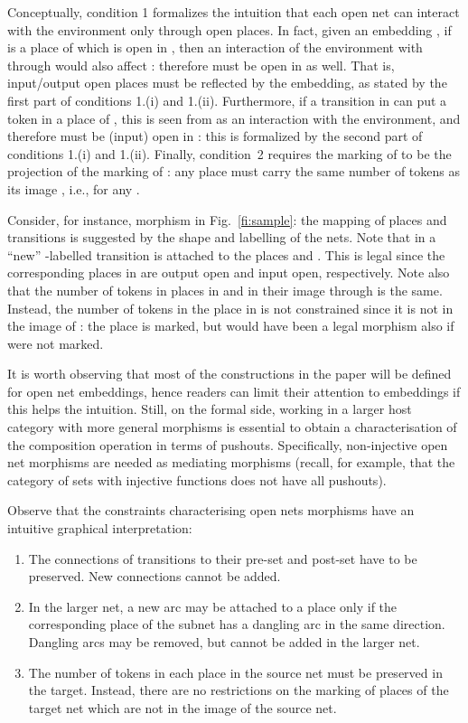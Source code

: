 \documentclass{LMCS}
\begin{document}
Conceptually, condition 1 formalizes the
intuition that each open net can interact with the environment only
through open places.  In fact, given an embedding ,
if  is a place of  which is
open in , then an interaction of the environment with 
through  would also affect : therefore  must be open in
 as well. That is, input/output open places must be reflected by
the embedding, as stated by the first part of conditions 1.(i) and
1.(ii).  Furthermore, if a transition in  can put a
token in a place  of , this is seen from  as an
interaction with the environment, and therefore  must be (input)
open in : this is formalized by the second part of conditions
1.(i) and 1.(ii).  
Finally, condition~2 requires the marking of  to be the
projection of the marking of : any place  must
carry the same number of tokens as its image ,
i.e.,  for any .




Consider, for instance, morphism  in
Fig.~\ref{fi:sample}: the mapping of places and transitions
is suggested by the shape and labelling of the nets.
Note that in
 a ``new'' -labelled transition is attached to the places 
and . This is legal since the corresponding places in  are
output open and input open, respectively. Note also that the
number of tokens in places in  and in their image through 
is the same.  Instead, the number of tokens in the place  in
 is not constrained since it is not in the image of : the
place is marked, but  would have been a legal morphism also if
 were not marked.

It is worth observing that most of the constructions in the paper will
be defined for open net embeddings, hence readers can limit their
attention to embeddings if this helps the intuition. Still, on the
formal side, working in a larger host category with more general
morphisms is essential to obtain a characterisation of the composition
operation in terms of pushouts. Specifically, non-injective open net
morphisms are needed as mediating morphisms (recall, for example, that
the category of sets with injective functions does not have all
pushouts).



Observe that the constraints characterising open nets morphisms have
an intuitive graphical interpretation:

\begin{enumerate}[]
\item
The connections of transitions to their pre-set and post-set have
  to be preserved. New connections cannot be added.

\item
In the larger net, a new arc may be attached to a place only if
  the corresponding place of the subnet has a dangling arc in the
  same direction. Dangling arcs may be removed, but cannot be added
  in the larger net.

\item 
The number of tokens in each place in the source net must be preserved in
  the target. Instead, there are no restrictions on the marking of places of
  the target net which are not in the image of the source net.
\end{enumerate}
\end{document}
